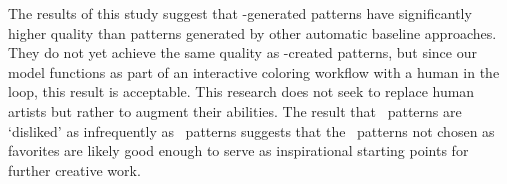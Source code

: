 The results of this study suggest that \modelSource-generated patterns have significantly higher quality than patterns generated by other automatic baseline approaches. They do not yet achieve the same quality as \artistSource-created patterns, but since our model functions as part of an interactive coloring workflow with a human in the loop, this result is acceptable. This research does not seek to replace human artists but rather to augment their abilities. The result that \modelSource~patterns are `disliked' as infrequently as \artistSource~patterns suggests that the \modelSource~patterns not chosen as favorites are likely good enough to serve as inspirational starting points for further creative work.